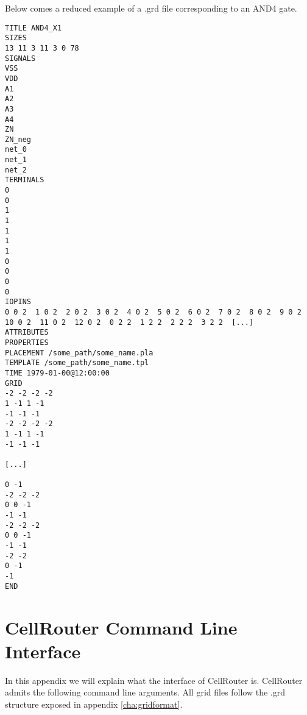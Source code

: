 Below comes a reduced example of a .grd file corresponding to an AND4 gate.
  
\begin{lstlisting}
TITLE AND4_X1
SIZES
13 11 3 11 3 0 78
SIGNALS
VSS
VDD
A1
A2
A3
A4
ZN
ZN_neg
net_0
net_1
net_2
TERMINALS
0
0
1
1
1
1
1
0
0
0
0
IOPINS
0 0 2  1 0 2  2 0 2  3 0 2  4 0 2  5 0 2  6 0 2  7 0 2  8 0 2  9 0 2  10 0 2  11 0 2  12 0 2  0 2 2  1 2 2  2 2 2  3 2 2  [...]
ATTRIBUTES
PROPERTIES
PLACEMENT /some_path/some_name.pla
TEMPLATE /some_path/some_name.tpl
TIME 1979-01-00@12:00:00
GRID
-2 -2 -2 -2 
1 -1 1 -1 
-1 -1 -1 
-2 -2 -2 -2 
1 -1 1 -1 
-1 -1 -1 

[...]

0 -1 
-2 -2 -2 
0 0 -1 
-1 -1 
-2 -2 -2 
0 0 -1 
-1 -1 
-2 -2 
0 -1 
-1 
END
\end{lstlisting}


\chapter{CellRouter Command Line Interface}
\label{cha:cli}

In this appendix we will explain what the interface of CellRouter is. CellRouter admits the following command line arguments. All grid files follow the .grd structure exposed in appendix \ref{cha:gridformat}.

